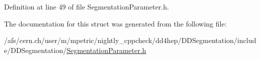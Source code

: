 Definition at line 49 of file SegmentationParameter.h.

The documentation for this struct was generated from the following file:\begin{DoxyCompactItemize}
\item 
/afs/cern.ch/user/m/mpetric/nightly\_\-cppcheck/dd4hep/DDSegmentation/include/DDSegmentation/\hyperlink{_segmentation_parameter_8h}{SegmentationParameter.h}\end{DoxyCompactItemize}
